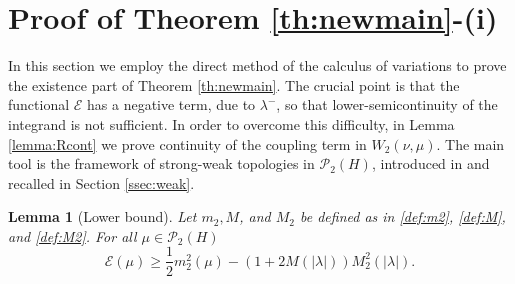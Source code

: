 \documentclass[12pt,a4paper]{article}
\renewcommand{\P}{\mathcal{P}}
\newcommand{\X}{\mathcal{P}_2(H)}
\theoremstyle{plain}
\newtheorem{lemma}[theorem]{Lemma}
\theoremstyle{definition}
\begin{document}
\section{Proof of Theorem \ref{th:newmain}-(i)}
\label{sec:hilbert}
In this section we employ the direct method of the calculus of variations to prove the existence part of Theorem \ref{th:newmain}. The crucial point is that the functional $\mathcal E$ has a negative term, due to $\lambda^-$, so that lower-semicontinuity of the integrand is not sufficient. In order to overcome this difficulty, in Lemma \ref{lemma:Rcont} we prove continuity of the coupling term in $W_2(\nu,\mu)$. The main tool is the framework of strong-weak topologies in $\P_2(H)$, introduced in \cite{naldi-savare} and recalled in Section \ref{ssec:weak}.

\begin{lemma}[Lower bound]
\label{lemma:lower}
Let $m_2,M$, and $M_2$ be defined as in \eqref{def:m2}, \eqref{def:M}, and \eqref{def:M2}. For all $\mu\in \X$
\begin{equation}
\label{eq:lower}
	\mathcal E(\mu) \geq \frac 12 m_2^2(\mu) - (1+2M(|\lambda|))M_2^2(|\lambda|).
\end{equation}
\end{lemma}
\end{document}
